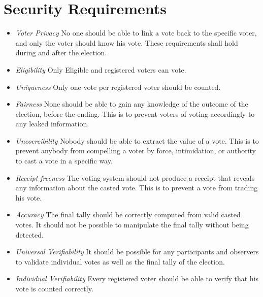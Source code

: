 \section{Security Requirements}

\cite{Cet08}
\begin{itemize}
    \item \textit{Voter Privacy}
        No one should be able to link a vote back to the specific voter, and only the voter should
        know his vote. These requirements shall hold during and after the election.  
    
    \item \textit{Eligibility}    
        Only Eligible and registered voters can vote. 
    
    \item \textit{Uniqueness}
        Only one vote per registered voter should be counted.
    
    \item \textit{Fairness}
        None should be able to gain any knowledge of the outcome of the election, before the ending. This is to prevent voters of voting accordingly to any leaked information. 
    
    \item \textit{Uncoercibility}
        Nobody should be able to extract the value of a vote. This is to prevent anybody from compelling a voter by force, intimidation, or authority to cast a vote in a specific way. 
    
    \item \textit{Receipt-freeness} 
        The voting system should not produce a receipt that reveals any information about the casted vote. This is to prevent a vote from trading his vote. 
    
    \item \textit{Accuracy} 
        The final tally should be correctly computed from valid casted votes. It should not be
        possible to manipulate the final tally without being detected. 
    
    \item \textit{Universal Verifiability}
        It should be possible for any participants and observers to validate individual votes as well as the final tally of the election. 
    
    \item \textit{Individual Verifiability}    
        Every registered voter should be able to verify that his vote is counted correctly. 
    
\end{itemize}

